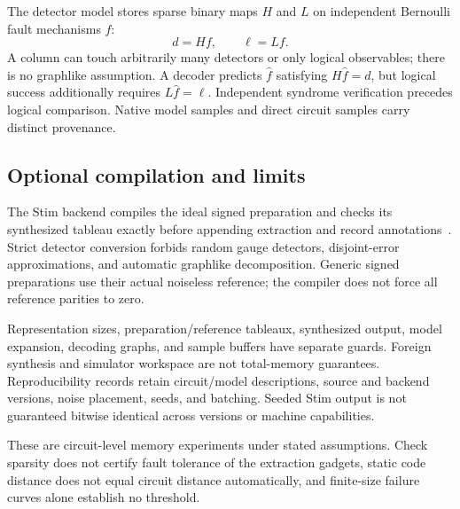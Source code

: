 The detector model stores sparse binary maps $H$ and $L$ on independent
Bernoulli fault mechanisms $f$:
\begin{equation}
 d=Hf,\qquad \ell=Lf.
\end{equation}
A column can touch arbitrarily many detectors or only logical observables;
there is no graphlike assumption. A decoder predicts $\hat f$ satisfying
$H\hat f=d$, but logical success additionally requires $L\hat f=\ell$.
Independent syndrome verification precedes logical comparison. Native
model samples and direct circuit samples carry distinct provenance.

\subsection{Optional compilation and limits}
The Stim backend compiles the ideal signed preparation and checks its
synthesized tableau exactly before appending extraction and record
annotations~\cite{gidney2021,stim116}. Strict detector conversion forbids random
gauge detectors, disjoint-error approximations, and automatic graphlike
decomposition. Generic signed preparations use their actual noiseless
reference; the compiler does not force all reference parities to zero.

Representation sizes, preparation/reference tableaux, synthesized output,
model expansion, decoding graphs, and sample buffers have separate guards.
Foreign synthesis and simulator workspace are not total-memory guarantees.
Reproducibility records retain circuit/model descriptions, source and
backend versions, noise placement, seeds, and batching. Seeded Stim output
is not guaranteed bitwise identical across versions or machine capabilities.

These are circuit-level memory experiments under stated assumptions.
Check sparsity does not certify fault tolerance of the extraction gadgets,
static code distance does not equal circuit distance automatically, and
finite-size failure curves alone establish no threshold.
